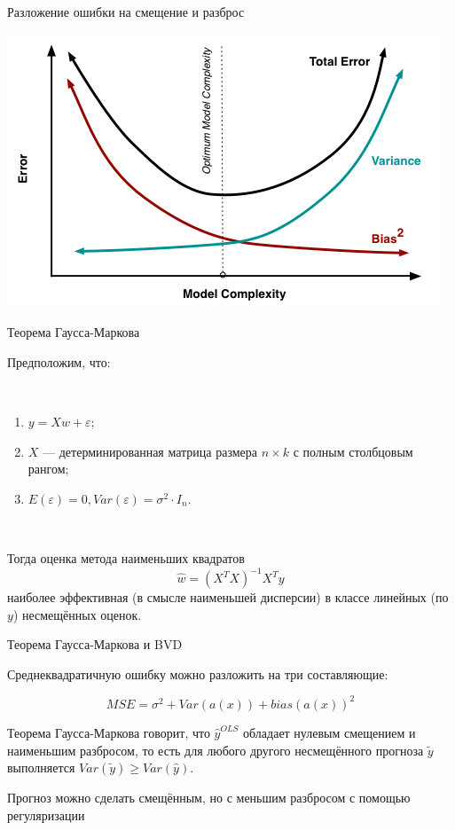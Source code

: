 \documentclass[notes,12pt, aspectratio=169]{beamer}
\newenvironment{wideitemize}{\itemize\addtolength{\itemsep}{10pt}}{\enditemize}
\begin{document}
\begin{frame}{Разложение ошибки на смещение и разброс}
	\begin{center}
			\includegraphics[scale=0.55]{est_var_2.png}
		\end{center}
\end{frame}


 \begin{frame}{Теорема Гаусса-Маркова}
	
	Предположим, что:
	
	\mbox{   }
	
	\begin{enumerate} 
		\item $y = X w + \varepsilon$;
		\item $X$ — детерминированная матрица размера $n \times k$ с полным столбцовым рангом;
		\item $E(\varepsilon) = 0, Var(\varepsilon) = \sigma^2 \cdot I_n$.
	\end{enumerate}
	
	\mbox{   }
	
	Тогда оценка метода наименьших квадратов \[\hat w = (X^TX)^{-1}X^Ty\] наиболее эффективная (в смысле наименьшей дисперсии) в классе линейных (по $y$) несмещённых оценок.
\end{frame}


\begin{frame}{Теорема Гаусса-Маркова и BVD}

	\begin{wideitemize}
		
		\item Среднеквадратичную ошибку можно разложить на три составляющие:
		
		\[ MSE  = \sigma^2 +  Var( a(x) ) + bias(a(x))^2  \]

		
		\item Теорема Гаусса-Маркова говорит, что $\hat y^{OLS}$ обладает нулевым смещением и наименьшим разбросом, то есть для любого другого несмещённого прогноза $\tilde y$ выполняется $Var(\tilde y) \ge Var( \hat y)$. 
		
		\item Прогноз можно сделать смещённым, но с меньшим разбросом с помощью регуляризации
	
	\end{wideitemize}
\end{frame}
\end{document}
